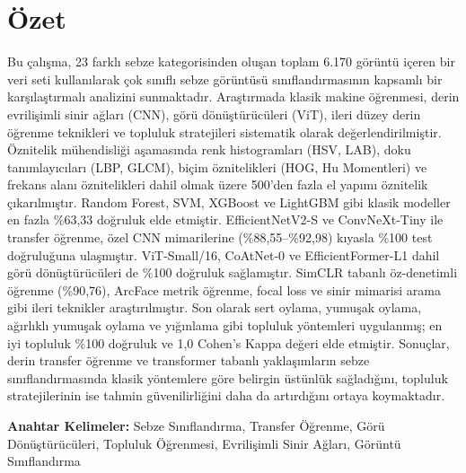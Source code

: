\documentclass[conference]{IEEEtran}
\begin{document}
\shorthandoff{=} %

\section*{\"{O}zet}
Bu \c{c}al{\i}\c{s}ma, 23 farkl{\i} sebze kategorisinden olu\c{s}an toplam 6.170 g\"{o}r\"{u}nt\"{u} i\c{c}eren bir veri seti kullan{\i}larak \c{c}ok s{\i}n{\i}fl{\i} sebze g\"{o}r\"{u}nt\"{u}s\"{u} s{\i}n{\i}fland{\i}rmas{\i}n{\i}n kapsaml{\i} bir kar\c{s}{\i}la\c{s}t{\i}rmal{\i} analizini sunmaktad{\i}r. Ara\c{s}t{\i}rmada klasik makine \"{o}\u{g}renmesi, derin evrili\c{s}imli sinir a\u{g}lar{\i} (CNN), g\"{o}r\"{u} d\"{o}n\"{u}\c{s}t\"{u}r\"{u}c\"{u}leri (ViT), ileri d\"{u}zey derin \"{o}\u{g}renme teknikleri ve topluluk stratejileri sistematik olarak de\u{g}erlendirilmi\c{s}tir. \"{O}znitelik m\"{u}hendisli\u{g}i a\c{s}amas{\i}nda renk histogramlar{\i} (HSV, LAB), doku tan{\i}mlay{\i}c{\i}lar{\i} (LBP, GLCM), bi\c{c}im \"{o}znitelikleri (HOG, Hu Momentleri) ve frekans alan{\i} \"{o}znitelikleri dahil olmak \"{u}zere 500'den fazla el yap{\i}m{\i} \"{o}znitelik \c{c}{\i}kar{\i}lm{\i}\c{s}t{\i}r. Random Forest, SVM, XGBoost ve LightGBM gibi klasik modeller en fazla \%63,33 do\u{g}ruluk elde etmi\c{s}tir. EfficientNetV2-S ve ConvNeXt-Tiny ile transfer \"{o}\u{g}renme, \"{o}zel CNN mimarilerine ({\%}88,55--{\%}92,98) k{\i}yasla \%100 test do\u{g}rulu\u{g}una ula\c{s}m{\i}\c{s}t{\i}r. ViT-Small/16, CoAtNet-0 ve EfficientFormer-L1 dahil g\"{o}r\"{u} d\"{o}n\"{u}\c{s}t\"{u}r\"{u}c\"{u}leri de \%100 do\u{g}ruluk sa\u{g}lam{\i}\c{s}t{\i}r. SimCLR tabanl{\i} \"{o}z-denetimli \"{o}\u{g}renme (\%90,76), ArcFace metrik \"{o}\u{g}renme, focal loss ve sinir mimarisi arama gibi ileri teknikler ara\c{s}t{\i}r{\i}lm{\i}\c{s}t{\i}r. Son olarak sert oylama, yumu\c{s}ak oylama, a\u{g}{\i}rl{\i}kl{\i} yumu\c{s}ak oylama ve y{\i}\u{g}{\i}nlama gibi topluluk y\"{o}ntemleri uygulanm{\i}\c{s}; en iyi topluluk \%100 do\u{g}ruluk ve 1,0 Cohen's Kappa de\u{g}eri elde etmi\c{s}tir. Sonu\c{c}lar, derin transfer \"{o}\u{g}renme ve transformer tabanl{\i} yakla\c{s}{\i}mlar{\i}n sebze s{\i}n{\i}fland{\i}rmas{\i}nda klasik y\"{o}ntemlere g\"{o}re belirgin \"{u}st\"{u}nl\"{u}k sa\u{g}lad{\i}\u{g}{\i}n{\i}, topluluk stratejilerinin ise tahmin g\"{u}venilirli\u{g}ini daha da art{\i}rd{\i}\u{g}{\i}n{\i} ortaya koymaktad{\i}r.

\smallskip
\noindent\textbf{Anahtar Kelimeler:} Sebze S{\i}n{\i}fland{\i}rma, Transfer \"{O}\u{g}renme, G\"{o}r\"{u} D\"{o}n\"{u}\c{s}t\"{u}r\"{u}c\"{u}leri, Topluluk \"{O}\u{g}renmesi, Evrili\c{s}imli Sinir A\u{g}lar{\i}, G\"{o}r\"{u}nt\"{u} S{\i}n{\i}fland{\i}rma
\end{document}
